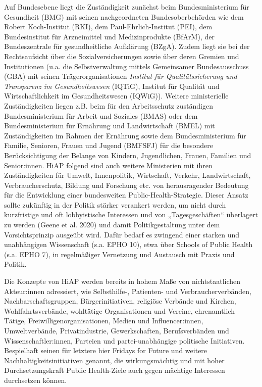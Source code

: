 \documentclass{article}
\begin{document}
Auf Bundesebene liegt die Zuständigkeit zunächst beim Bundesministerium für Gesundheit (BMG) mit seinen nachgeordneten Bundesoberbehörden wie dem Robert Koch-Institut (RKI), dem Paul-Ehrlich-Institut (PEI), dem Bundesinstitut für Arzneimittel und Medizinprodukte (BfArM), der Bundeszentrale für gesundheitliche Aufklärung (BZgA). Zudem liegt sie bei der Rechtsaufsicht über die Sozialversicherungen sowie über deren Gremien und Institutionen (u.a. die Selbstverwaltung mittels Gemeinsamer Bundesausschuss (GBA) mit seinen Trägerorganisationen \emph{Institut für Qualitätssicherung und Transparenz im Gesundheitswesen} (IQTiG), Institut für Qualität und Wirtschaftlichkeit im Gesundheitswesen (IQWiG)). Weitere ministerielle Zuständigkeiten liegen z.B. beim für den Arbeitsschutz zuständigen Bundesministerium für Arbeit und Soziales (BMAS) oder dem Bundesministerium für Ernährung und Landwirtschaft (BMEL) mit Zuständigkeiten im Rahmen der Ernährung sowie dem Bundesministerium für Familie, Senioren, Frauen und Jugend (BMFSFJ) für die besondere Berücksichtigung der Belange von Kindern, Jugendlichen, Frauen, Familien und Senior:innen. HiAP folgend sind auch weitere Ministerien mit ihren Zuständigkeiten für Umwelt, Innenpolitik, Wirtschaft, Verkehr, Landwirtschaft, Verbraucherschutz, Bildung und Forschung etc. von herausragender Bedeutung für die Entwicklung einer bundesweiten Public-Health-Strategie. Dieser Ansatz sollte zukünftig in der Politik stärker verankert werden, um nicht durch kurzfristige und oft lobbyistische Interessen und von „Tagesgeschäften“ überlagert zu werden (Geene et al. 2020) und damit Politikgestaltung unter dem Vorsichtsprinzip ausgeübt wird. Dafür bedarf es zwingend einer starken und unabhängigen Wissenschaft (s.a. EPHO 10), etwa über Schools of Public Health (s.a. EPHO 7), in regelmäßiger Vernetzung und Austausch mit Praxis und Politik.


Die Konzepte von HiAP werden bereits in hohem Maße von nichtstaatlichen Akteur:innen adressiert, wie Selbsthilfe-, Patienten- und Verbraucherverbänden, Nachbarschaftsgruppen, Bürgerinitiativen, religiöse Verbände und Kirchen, Wohlfahrtsverbände, wohltätige Organisationen und Vereine, ehrenamtlich Tätige, Freiwilligenorganisationen, Medien und Influencer:innen, Umweltverbände, Privatindustrie, Gewerkschaften, Berufsverbänden und Wissenschaftler:innen, Parteien und partei-unabhängige politische Initiativen. Bespielhaft seinen für letztere hier Fridays for Future und weitere Nachhaltigkeitsinitiativen genannt, die wirkungsmächtig und mit hoher Durchsetzungskraft Public Health-Ziele auch gegen mächtige Interessen durchsetzen können.
\end{document}
